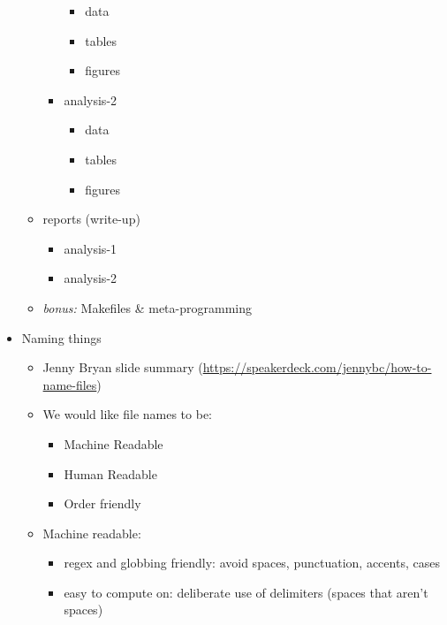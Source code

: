 \documentclass[
  12pt,
]{book}
\providecommand{\tightlist}{%
  \setlength{\itemsep}{0pt}\setlength{\parskip}{0pt}}
\theoremstyle{definition}
\theoremstyle{definition}
\theoremstyle{definition}
\theoremstyle{definition}
\theoremstyle{remark}
\begin{document}
\begin{itemize}
\begin{itemize}
\begin{itemize}
      \begin{itemize}
      \tightlist
      \item
        data
      \item
        tables
      \item
        figures
      \end{itemize}
    \item
      analysis-2

      \begin{itemize}
      \tightlist
      \item
        data
      \item
        tables
      \item
        figures
      \end{itemize}
    \end{itemize}
  \item
    reports (write-up)

    \begin{itemize}
    \tightlist
    \item
      analysis-1
    \item
      analysis-2
    \end{itemize}
  \item
    \emph{bonus:} Makefiles \& meta-programming
  \end{itemize}
\item
  Naming things

  \begin{itemize}
  \item
    Jenny Bryan slide summary (\url{https://speakerdeck.com/jennybc/how-to-name-files})
  \item
    We would like file names to be:

    \begin{itemize}
    \tightlist
    \item
      Machine Readable
    \item
      Human Readable
    \item
      Order friendly
    \end{itemize}
  \item
    Machine readable:

    \begin{itemize}
    \tightlist
    \item
      regex and globbing friendly: avoid spaces, punctuation, accents, cases
    \item
      easy to compute on: deliberate use of delimiters (spaces that aren't spaces)


\end{itemize}
\end{itemize}
\end{itemize}
\end{document}
